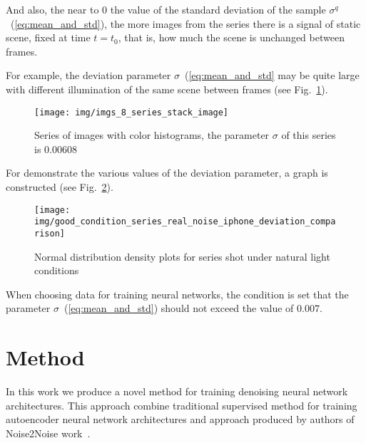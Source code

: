 \documentclass[runningheads]{llncs}
\begin{document}
And also, the near to $0$ the value of the standard deviation of the sample $\sigma^q$~(\ref{eq:mean_and_std}), the more images from the series there is a signal of static scene, fixed at time $ t = t_0 $, that is, how much the scene is unchanged between frames.

For example, the deviation parameter $\sigma$~(\ref{eq:mean_and_std} may be quite large with different illumination of the same scene between frames (see Fig.~\ref{fig:hists_comparision}).

\begin{figure}
	\centering
	\texttt{[image: img/imgs\_8\_series\_stack\_image]}
	\caption{Series of images with color histograms, the parameter $\sigma$ of this series is $0.00608$}
	\label{fig:hists_comparision}
\end{figure}

For demonstrate the various values of the deviation parameter, a graph is constructed (see Fig.~\ref{fig:distribuion_real_noise_good_condition}).


\begin{figure}
	\centering
	\texttt{[image: img/good\_condition\_series\_real\_noise\_iphone\_deviation\_comparison]}
	\caption{Normal distribution density plots for series shot under natural light conditions}
	\label{fig:distribuion_real_noise_good_condition}
\end{figure}


When choosing data for training neural networks, the condition is set that the parameter $\sigma$~(\ref{eq:mean_and_std}) should not exceed the value of $0.007$.


\section{Method}
\label{sec:method}

In this work we produce a novel method for training denoising neural network architectures. This approach combine traditional supervised method for training autoencoder neural network architectures and approach produced by authors of Noise2Noise work~\cite{noise2noise_paper}.
\end{document}
